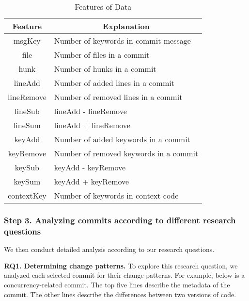 \begin{table}
	\centering
	\caption{Features of Data}\vspace*{-2ex}
	\label{table:feature}
	\begin{tabular}{|c|l|}\hline
		Feature&\multicolumn{1}{|c|}{Explanation}\\\hline
		msgKey&Number of keywords in commit message\\
		file&Number of files in a commit\\
		hunk&Number of hunks in a commit\\
		lineAdd&Number of added lines in a commit\\
		lineRemove&Number of removed lines in a commit\\
		lineSub&lineAdd - lineRemove\\
		lineSum&lineAdd + lineRemove\\
		keyAdd&Number of added keywords in a commit\\
		keyRemove&Number of removed keywords in a commit\\
		keySub&keyAdd - keyRemove\\
		keySum&keyAdd + keyRemove\\
		contextKey&Number of keywords in context code\\\hline
	\end{tabular}\vspace*{-3ex}
\end{table}

\subsubsection{Step 3. Analyzing commits according to different research questions} We then conduct detailed analysis according to our research questions.


\textbf{RQ1. Determining change patterns.} To explore this research question, we analyzed each selected commit for their change patterns. For example, below is a concurrency-related commit. The top five lines describe the metadata of the commit. The other lines describe the differences between two versions of code.

